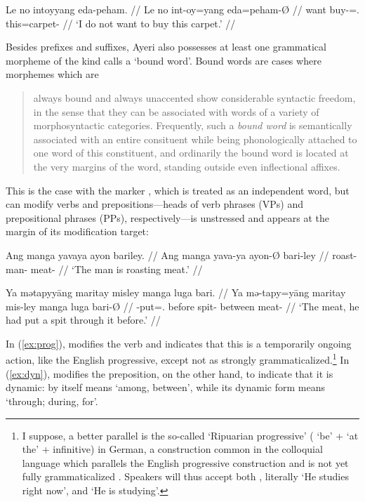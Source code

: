 \ex\begingl
	\gla Le no intoyyang eda-peham. //
	\glb Le no int-oy=yang eda=peham-Ø //
	\glc \PatTI{} want buy-\Neg{}=\Fsg{}.\Aarg{} this=carpet-\Top{} //
	\glft `I do not want to buy this carpet.' //
\endgl\xe

Besides prefixes and suffixes, Ayeri also possesses at least one grammatical 
morpheme of the kind \citet{zwicky1977} calls a `bound word'. Bound words are cases where morphemes which are

\blockcquote[6]{zwicky1977}{always bound and always unaccented show 
considerable syntactic freedom, in the sense that they can be associated with 
words of a variety of morphosyntactic categories. Frequently, such a \emph{bound 
word} is semantically associated with an entire consituent while being 
phonologically attached to one word of this constituent, and ordinarily the 
bound word is located at the very margins of the word, standing outside even 
inflectional affixes.}

This is the case with the marker , which is treated as an 
independent word, but can modify verbs and prepositions---heads of verb 
phrases (VPs) and prepositional phrases (PPs), respectively---is unstressed and 
appears at the margin of its modification target:

\pex
\a\label{ex:prog}\begingl
	\gla Ang manga yavaya ayon bariley. //
	\glb Ang manga yava-ya ayon-Ø bari-ley //
	\glc \AgtT{} \Prog{} roast-\TsgM{} man-\Top{} meat-\PargI{} //
	\glft `The man is roasting meat.' //
\endgl

\a\label{ex:dyn}\begingl
	\gla Ya mətapyyāng maritay misley manga luga bari. //
	\glb Ya mə-tapy=yāng maritay mis-ley manga luga bari-Ø //
	\glc \LocT{} \Pst{}-put=\TsgM{}.\Aarg{} before spit-\PargI{} \Dyn{} 
		between meat-\Top{} //
	\glft `The meat, he had put a spit through it before.' //
\endgl

\xe

In (\ref{ex:prog}),  modifies the verb  
and indicates that this is a temporarily ongoing action, like the English 
progressive, except not as strongly grammaticalized.\footnote{I suppose, a 
better parallel is the so-called  `Ripuarian 
progressive' ( `be' +  `at the' + infinitive) in German, a 
construction common in the colloquial language which parallels the English 
progressive construction and is not yet fully grammaticalized 
\citep[435]{dudengram2016}. Speakers will thus accept both , literally `He studies right now', and  `He is 
studying'.
% 
}
%
In (\ref{ex:dyn}),  modifies the preposition, on the other 
hand, to indicate that it is dynamic:  by itself means `among, 
between', while its dynamic form  means `through; 
during, for'.

